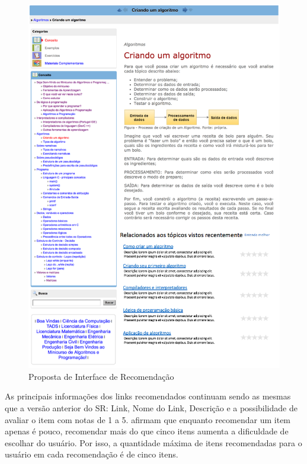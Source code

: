 \begin{figure}[htb]
  \caption{\label{fig:adaptweb-proposta-recomendacao}Proposta de Interface de Recomendação}
  \begin{center}
      \includegraphics[scale=1.0]{./Figuras/recomendacoes_v2.png}
  \end{center}
\end{figure}

As principais informações dos links recomendados continuam sendo as mesmas que a versão anterior do SR: Link, Nome do Link,
Descrição e a possibilidade de avaliar o item com notas de 1 a 5.  afirmam que enquanto
recomendar um item apenas é pouco, recomendar mais do que cinco itens aumenta a dificuldade de escolhar do usuário. Por isso,
a quantidade máxima de itens recomendadas para o usuário em cada recomendação é de cinco itens.

